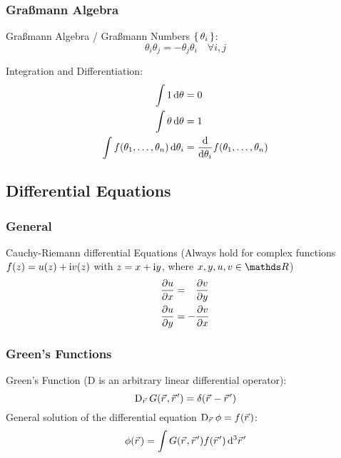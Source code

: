 		\subsubsection{Graßmann Algebra}
			\noindent
			Graßmann Algebra / Graßmann Numbers $\set{\theta_i}$:
			\begin{equation}
				\theta_i \theta_j = - \theta_j \theta_i \quad \forall i,j
			\end{equation}

			\noindent
			Integration and Differentiation:
			\begin{equation}
				\begin{aligned}
					\int 1\dd{\theta} &= 0 \\
					\int \theta\dd{{\theta}} &= 1 \\
					\int f(\theta_1,\dots,\theta_n)\dd{\theta_i} &= \dv{\theta_i}f(\theta_1,\dots,\theta_n)
				\end{aligned}
			\end{equation}

	\subsection{Differential Equations}
		\subsubsection{General}
			\noindent
			Cauchy-Riemann differential Equations (Always hold for complex functions $f(z)=u(z)+\mathrm{i} v(z)$ with $z=x+\mathrm{i} y$, where $x,y,u,v\in\reals $)
			\begin{equation}
				\begin{aligned}
					\pdv{u}{x} &= \phantom{-}\pdv{v}{y} \\
					\pdv{u}{y} &= -\pdv{v}{x} \\
				\end{aligned}
			\end{equation}


		\subsubsection{Green's Functions}
			\noindent
			Green's Function ($\mathrm{D}$ is an arbitrary linear differential operator):
			\begin{equation}
				\mathrm{D}_{\vec{r}}\, G\qty(\vec{r},\vec{r}') = \delta\qty(\vec{r} - \vec{r}')
			\end{equation}
			General solution of the differential equation $\mathrm{D}_{\vec{r}}\, \phi = f\qty(\vec{r})$:
			\begin{equation}
				\phi\qty(\vec{r}) = \int G\qty(\vec{r},\vec{r}')f\qty(\vec{r}') \dd[3]{\vec{r}'}
			\end{equation}

